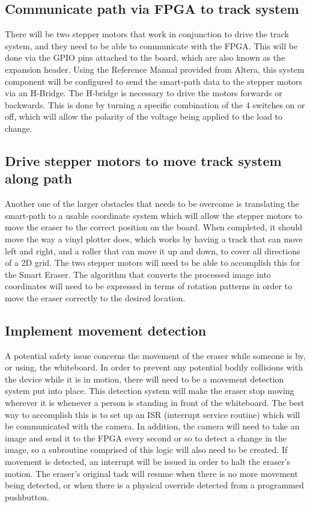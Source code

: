 \documentclass{IEEEtran}					%
\begin{document}
	\subsection{Communicate path via FPGA to track system}
	There will be two stepper motors that work in conjunction to drive the track system, and they need to be able to communicate with the FPGA. This will be done via the GPIO pins attached to the board, which are also known as the expansion header. Using the Reference Manual provided from Altera, this system component will be configured to send the smart-path data to the stepper motors via an H-Bridge. The H-bridge is necessary to drive the motors forwards or backwards. This is done by turning a specific combination of the 4 switches on or off, which will allow the polarity of the voltage being applied to the load to change. 
	
	\subsection{Drive stepper motors to move track system along path}
	Another one of the larger obstacles that needs to be overcome is translating the smart-path to a usable coordinate system which will allow the stepper motors to move the eraser to the correct position on the board. When completed, it should move the way a vinyl plotter does, which works by having a track that can move left and right, and a roller that can move it up and down, to cover all directions of a 2D grid. The two stepper motors will need to be able to accomplish this for the Smart Eraser. The algorithm that converts the processed image into coordinates will need to be expressed in terms of rotation patterns in order to move the eraser correctly to the desired location.
	
	\subsection{Implement movement detection}
	A potential safety issue concerns the movement of the eraser while someone is by, or using, the whiteboard. In order to prevent any potential bodily collisions with the device while it is in motion, there will need to be a movement detection system put into place. This detection system will make the eraser stop moving wherever it is whenever a person is standing in front of the whiteboard. The best way to accomplish this is to set up an ISR (interrupt service routine) which will be communicated with the camera. In addition, the camera will need to take an image and send it to the FPGA every second or so to detect a change in the image, so a subroutine comprised of this logic will also need to be created. If movement is detected, an interrupt will be issued in order to halt the eraser{\rq}s motion. The eraser{\rq}s original task will resume when there is no more movement being detected, or when there is a physical override detected from a programmed pushbutton.
	
\end{document}

